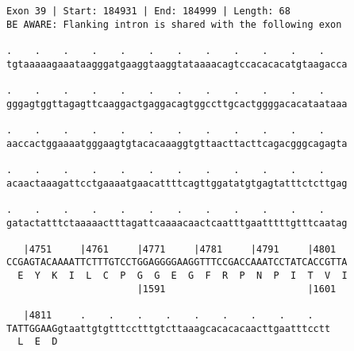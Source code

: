 \documentclass{article}
\begin{document}
\newpage
\begin{Verbatim}
Exon 39 | Start: 184931 | End: 184999 | Length: 68
BE AWARE: Flanking intron is shared with the following exon
 
.    .    .    .    .    .    .    .    .    .    .    .    
tgtaaaaagaaataagggatgaaggtaaggtataaaacagtccacacacatgtaagacca
  
.    .    .    .    .    .    .    .    .    .    .    .    
gggagtggttagagttcaaggactgaggacagtggccttgcactggggacacataataaa
  
.    .    .    .    .    .    .    .    .    .    .    .    
aaccactggaaaatgggaagtgtacacaaaggtgttaacttacttcagacgggcagagta
  
.    .    .    .    .    .    .    .    .    .    .    .    
acaactaaagattcctgaaaatgaacattttcagttggatatgtgagtatttctcttgag
  
.    .    .    .    .    .    .    .    .    .    .    .    
gatactatttctaaaaactttagattcaaaacaactcaatttgaatttttgtttcaatag
  
   |4751     |4761     |4771     |4781     |4791     |4801  
CCGAGTACAAAATTCTTTGTCCTGGAGGGGAAGGTTTCCGACCAAATCCTATCACCGTTA
  E  Y  K  I  L  C  P  G  G  E  G  F  R  P  N  P  I  T  V  I
                       |1591                         |1601  
  
   |4811     .    .    .    .    .    .    .    .    .   
TATTGGAAGgtaattgtgtttcctttgtcttaaagcacacacaacttgaatttcctt
  L  E  D                                                
\end{Verbatim}
\newpage
\end{document}
